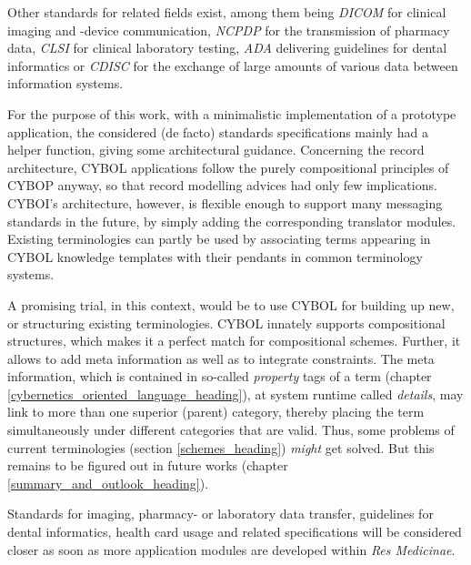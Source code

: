 Other standards for related fields exist, among them being \emph{DICOM} for
clinical imaging and -device communication, \emph{NCPDP} for the transmission
of pharmacy data, \emph{CLSI} for clinical laboratory testing, \emph{ADA}
delivering guidelines for dental informatics or \emph{CDISC} for the exchange
of large amounts of various data between information systems.

For the purpose of this work, with a minimalistic implementation of a prototype
application, the considered (de facto) standards specifications mainly had a
helper function, giving some architectural guidance. Concerning the record
architecture, CYBOL applications follow the purely compositional principles of
CYBOP anyway, so that record modelling advices had only few implications.
CYBOI's architecture, however, is flexible enough to support many messaging
standards in the future, by simply adding the corresponding translator modules.
Existing terminologies can partly be used by associating terms appearing in
CYBOL knowledge templates with their pendants in common terminology systems.

A promising trial, in this context, would be to use CYBOL for building up new,
or structuring existing terminologies. CYBOL innately supports compositional
structures, which makes it a perfect match for compositional schemes. Further,
it allows to add meta information as well as to integrate constraints. The meta
information, which is contained in so-called \emph{property} tags of a term
(chapter \ref{cybernetics_oriented_language_heading}), at system runtime called
\emph{details}, may link to more than one superior (parent) category, thereby
placing the term simultaneously under different categories that are valid.
Thus, some problems of current terminologies (section \ref{schemes_heading})
\emph{might} get solved. But this remains to be figured out in future works
(chapter \ref{summary_and_outlook_heading}).

Standards for imaging, pharmacy- or laboratory data transfer, guidelines for
dental informatics, health card usage and related specifications will be
considered closer as soon as more application modules are developed within
\emph{Res Medicinae}.
